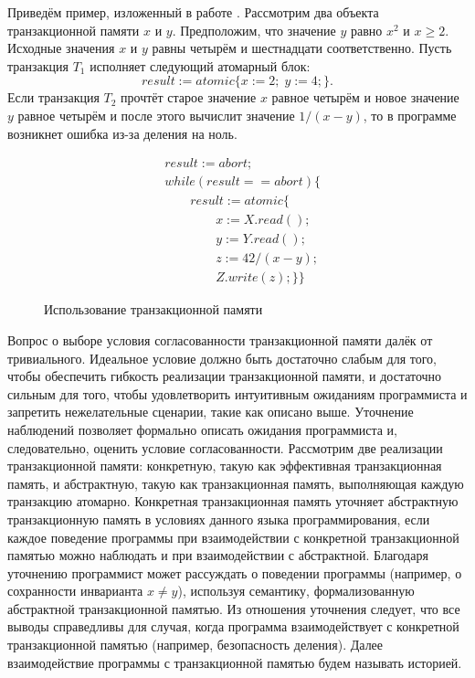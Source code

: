 Приведём пример, изложенный в работе \cite{Guerraoui07opacity:a}. Рассмотрим два объекта транзакционной памяти $x$ и $y$. Предположим, что значение $y$ равно $x^2$ и $x \geq 2$. Исходные значения $x$ и $y$ равны четырём и шестнадцати соответственно. Пусть транзакция $T_1$ исполняет следующий атомарный блок: $$ result := atomic \{ x := 2; \; y := 4; \}.$$ Если транзакция $T_2$ прочтёт старое значение $x$ равное четырём и новое значение $y$ равное четырём и после этого вычислит значение $1 / (x - y)$, то в программе возникнет ошибка из-за деления на ноль.

\begin{figure}[t]
\begin{align*}
&result := abort;\\
&while \left (result == abort \right) \{ \\
& \qquad result := atomic \{ \\
& \qquad \qquad x := X.read(); \\
& \qquad \qquad y := Y.read(); \\ 
& \qquad \qquad z := 42 / (x - y); \\
& \qquad \qquad Z.write(z);\}\}
\end{align*}
\caption{Использование транзакционной памяти}
\label{fig:tm}
\end{figure}
Вопрос о выборе условия согласованности транзакционной памяти далёк от тривиального. Идеальное условие должно быть достаточно слабым для того, чтобы обеспечить гибкость реализации транзакционной памяти, и достаточно сильным для того, чтобы удовлетворить интуитивным ожиданиям программиста и запретить нежелательные сценарии, такие как описано выше. Уточнение наблюдений позволяет формально описать ожидания программиста и, следовательно, оценить условие согласованности. Рассмотрим две реализации транзакционной памяти: конкретную, такую как эффективная транзакционная память, и абстрактную, такую как транзакционная память, выполняющая каждую транзакцию атомарно. Конкретная транзакционная память уточняет абстрактную транзакционную память в условиях данного языка программирования, если каждое поведение программы при взаимодействии с конкретной транзакционной памятью можно наблюдать и при взаимодействии с абстрактной. Благодаря уточнению программист может рассуждать о поведении программы (например, о сохранности инварианта $x \neq y$), используя семантику, формализованную абстрактной транзакционной памятью. Из отношения уточнения следует, что все выводы справедливы для случая, когда программа взаимодействует с конкретной транзакционной памятью (например, безопасность деления). Далее взаимодействие программы с транзакционной памятью будем называть историей.    

